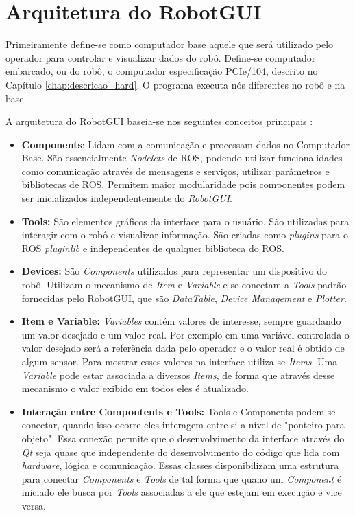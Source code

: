 \section{Arquitetura do RobotGUI}

Primeiramente define-se como computador base aquele que será utilizado pelo operador para controlar e visualizar dados do robô. Define-se computador embarcado, ou do robô, o computador especificação PCIe/104, descrito no Capítulo \ref{chap:descricao_hard}. O programa executa nós diferentes no robô e na base.

A arquitetura do RobotGUI baseia-se nos seguintes conceitos principais \citep{nunes2013doris}:

\begin{itemize}
\item \textbf{Components}: Lidam com a comunicação e processam dados no Computador Base. São essencialmente \textit{Nodelets} de ROS, podendo utilizar funcionalidades como comunicação através de mensagens e serviços, utilizar parâmetros e bibliotecas de ROS. Permitem maior modularidade pois componentes podem ser inicializados independentemente do \textit{RobotGUI}.

\item \textbf{Tools:} São elementos gráficos da interface para o usuário. São utilizadas para interagir com o robô e visualizar informação. São criadas como \textit{plugins} para o ROS \textit{pluginlib} e independentes de qualquer biblioteca do ROS.

\item \textbf{Devices:} São \textit{Components} utilizados para representar um dispositivo do robô. Utilizam o mecanismo de \textit{Item} e \textit{Variable} e se conectam a \textit{Tools} padrão fornecidas pelo RobotGUI, que são \textit{DataTable}, \textit{Device Management} e \textit{Plotter}. 

\item \textbf{Item e Variable:} \textit{Variables} contém valores de interesse, sempre guardando um valor desejado e um valor real. Por exemplo em uma variável controlada o valor desejado será a referência dada pelo operador e o valor real é obtido de algum sensor. Para mostrar esses valores na interface utiliza-se \textit{Items}. Uma \textit{Variable} pode estar associada a diversos \textit{Items}, de forma que através desse mecanismo o valor exibido em todos eles é atualizado. 

\item \textbf{Interação entre Compontents e Tools:} Tools e Components podem se conectar, quando isso ocorre eles interagem entre si a nível de "ponteiro para objeto". Essa conexão permite que o desenvolvimento da interface através do \textit{Qt} seja quase que independente do desenvolvimento do código que lida com \textit{hardware}, lógica e comunicação. Essas classes disponibilizam uma estrutura para conectar \textit{Components} e \textit{Tools} de tal forma que quano um \textit{Component} é iniciado ele busca por \textit{Tools} associadas a ele que estejam em execução e vice versa. 


\end{itemize}
